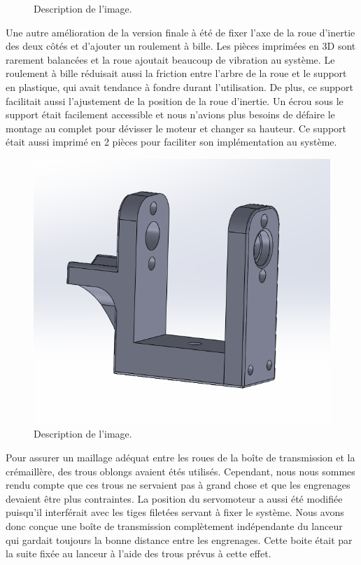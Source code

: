 \begin{figure}[h!]
    \caption{Description de l'image.}
    \label{fig:template-example-flottante}
\end{figure}

Une autre amélioration de la version finale à été de fixer l’axe de la roue d’inertie des deux côtés et d’ajouter un roulement à bille.
Les pièces imprimées en 3D sont rarement balancées et la roue ajoutait beaucoup de vibration au système.
Le roulement à bille réduisait aussi la friction entre l’arbre de la roue et le support en plastique, qui avait tendance à fondre durant l’utilisation.
De plus, ce support facilitait aussi l’ajustement de la position de la roue d’inertie.
Un écrou sous le support était facilement accessible et nous n’avions plus besoins de défaire le montage au complet pour dévisser le moteur et changer sa hauteur.
Ce support était aussi imprimé en 2 pièces pour faciliter son implémentation au système.

\begin{figure}[h!]
    \centering
    \includegraphics[width=0.5\linewidth]{img/s2/cad/motorholer}
    \caption{Description de l'image.}
    \label{fig:s2-cad-motorholer}
\end{figure}


Pour assurer un maillage adéquat entre les roues de la boîte de transmission et la crémaillère, des trous oblongs avaient étés utilisés.
Cependant, nous nous sommes rendu compte que ces trous ne servaient pas à grand chose et que les engrenages devaient être plus contraintes.
La position du servomoteur a aussi été modifiée puisqu’il interférait avec les tiges filetées servant à fixer le système.
Nous avons donc conçue une boîte de transmission complètement indépendante du lanceur qui gardait toujours la bonne distance entre les engrenages.
Cette boite était par la suite fixée au lanceur à l’aide des trous prévus à cette effet.

